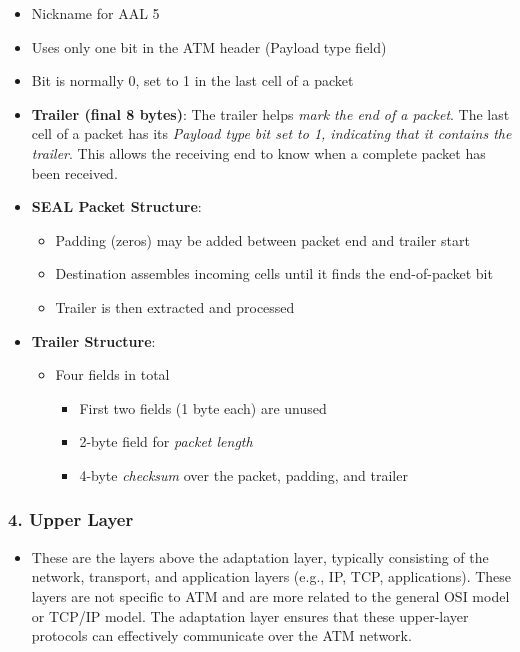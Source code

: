 \documentclass[
]{article}
\providecommand{\tightlist}{%
  \setlength{\itemsep}{0pt}\setlength{\parskip}{0pt}}
\begin{document}
\begin{itemize}
\tightlist
\item
  Nickname for AAL 5
\item
  Uses only one bit in the ATM header (Payload type field)
\item
  Bit is normally 0, set to 1 in the last cell of a packet
\item
  \textbf{Trailer (final 8 bytes)}: The trailer helps \emph{mark the end
  of a packet}. The last cell of a packet has its \emph{Payload type bit
  set to 1, indicating that it contains the trailer}. This allows the
  receiving end to know when a complete packet has been received.
\item
  \textbf{SEAL Packet Structure}:

  \begin{itemize}
  \tightlist
  \item
    Padding (zeros) may be added between packet end and trailer start
  \item
    Destination assembles incoming cells until it finds the
    end-of-packet bit
  \item
    Trailer is then extracted and processed
  \end{itemize}
\item
  \textbf{Trailer Structure}:

  \begin{itemize}
  \tightlist
  \item
    Four fields in total

    \begin{itemize}
    \tightlist
    \item
      First two fields (1 byte each) are unused
    \item
      2-byte field for \emph{packet length}
    \item
      4-byte \emph{checksum} over the packet, padding, and trailer
    \end{itemize}
  \end{itemize}
\end{itemize}

\hypertarget{upper-layer}{%
\subsubsection{4. Upper Layer}\label{upper-layer}}

\begin{itemize}
\tightlist
\item
  These are the layers above the adaptation layer, typically consisting
  of the network, transport, and application layers (e.g., IP, TCP,
  applications). These layers are not specific to ATM and are more
  related to the general OSI model or TCP/IP model. The adaptation layer
  ensures that these upper-layer protocols can effectively communicate
  over the ATM network.
\end{itemize}
\end{document}
